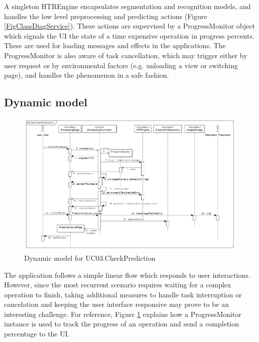  A singleton HTREngine encapsulates segmentation and recognition models, and handles the low level preprocessing and predicting actions (Figure \ref{FigClassDiagService}). These actions are supervised by a ProgressMonitor object which signals the UI the state of a time expensive operation in progress percents. These are used for loading messages and effects in the applications. The ProgressMonitor is also aware of task cancellation, which may trigger either by user request or by environmental factors (e.g. unloading a view or switching page), and handles the phenomenon in a safe fashion.

\subsection{Dynamic model}

\begin{figure}[htbp]
	\centering
		\includegraphics[scale=0.65]{figures/dynamic_model_checkPrediction.PNG}
	\caption{Dynamic model for UC03.CheckPrediction}
        \label{FigDynamicModelCP}
\end{figure}

The application follows a simple linear flow which responds to user interactions. However, since the most recurrent scenario requires waiting for a complex operation to finish, taking additional measures to handle task interruption or cancelation and keeping the user interface responsive may prove to be an interesting challenge. For reference, Figure \ref{FigDynamicModelCP} explains how a ProgressMonitor instance is used to track the progress of an operation and send a completion percentage to the UI. 


